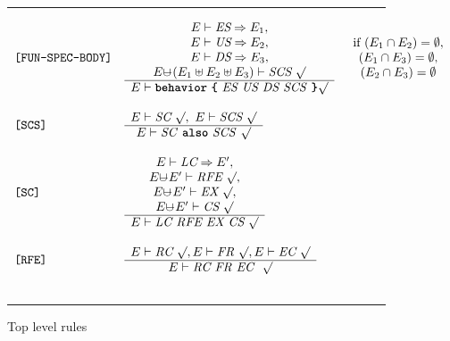 \documentclass[12pt]{article} %
\newcommand{\reserved}[1]{\textbf{\texttt{#1}}} %
\newcommand{\RULELAB}[1]{\texttt{#1}}
\newcommand{\uminus}{\mbox{$\cup\!\!\!\!-$}}
\newcommand{\UNSPACEFORBOX}{\vspace{-2ex}}
\newcommand{\HLINE}{\UNSPACEFORBOX%
\begin{flushleft}\rule{\textwidth}{0.01in}\end{flushleft}%
\UNSPACEFORBOX}
\newenvironment{BFIGURE}{

\begin{figure}
\small
\HLINE
}{
\HLINE
\normalsize
\end{figure}
}
\begin{document}
\begin{BFIGURE}
\begin{displaymath}
\begin{array}{lll}
\RULELAB{[FUN-SPEC-BODY]} &
\begin{array}{c}
E \vdash \mbox{\it ES} \Rightarrow E_1,\\
E \vdash \mbox{\it US} \Rightarrow E_2,\\
E \vdash \mbox{\it DS}\Rightarrow E_3,\\
E \uminus (E_1 \uplus E_2 \uplus E_3) \vdash \mbox{\it SCS}~\surd\\
\hline
E \vdash \mbox{\reserved{behavior} \reserved{\{} \textit{ES US DS SCS} \reserved{\}}} \surd
\end{array}
&
\begin{array}{c}
\mbox{if }(E_1 \cap E_2) = \emptyset,\\
(E_1 \cap E_3) = \emptyset,\\
(E_2 \cap E_3) = \emptyset
\end{array}
\\
~\\
\RULELAB{[SCS]} &
\begin{array}{c}
E \vdash \mbox{\it SC}~\surd,~E \vdash \mbox{\it SCS}~\surd\\
\hline
E \vdash \mbox{\textit{SC} \reserved{also} \textit{SCS}}~\surd
\end{array}
\\
~\\
\RULELAB{[SC]} &
\begin{array}{c}
E \vdash \mbox{\it LC} \Rightarrow E',\\
E \uminus E' \vdash \mbox{\it RFE}~ \surd,\\
E \uminus E' \vdash \mbox{\it EX}~ \surd,\\
E \uminus E' \vdash \mbox{\it CS}~ \surd\\
\hline
E \vdash \mbox{\it LC RFE EX CS}~ \surd
\end{array}
\\
~\\
\RULELAB{[RFE]} &
\begin{array}{c}
E \vdash \textit{RC}~\surd,E \vdash \textit{FR}~\surd,E\vdash \textit{EC}~ \surd\\
\hline
E \vdash \mbox{\it RC FR EC }~\surd
\end{array}
\\
~\\
\end{array}
\end{displaymath}
\caption{Top level rules}
\label{fig-one}
\end{BFIGURE}
\end{document}
